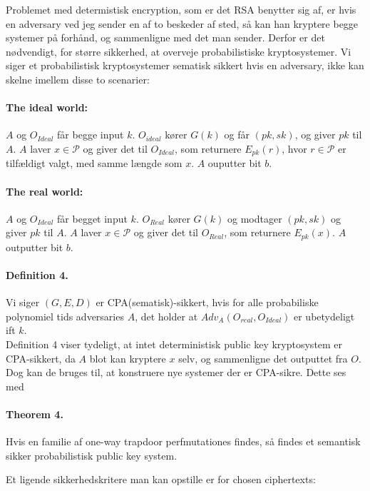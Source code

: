 \documentclass[paper=a4, fontsize=11pt]{scrartcl} %
\numberwithin{equation}{section} %
\numberwithin{figure}{section} %
\numberwithin{table}{section} %
\begin{document}
 	Problemet med determistisk encryption, som er det RSA benytter sig af, er hvis en adversary ved jeg sender en af to beskeder af sted, så kan han kryptere begge systemer på forhånd, og sammenligne med det man sender. Derfor er det nødvendigt, for større sikkerhed, at overveje probabilistiske kryptosystemer. Vi siger et probabilistisk kryptosystemer sematisk sikkert hvis en adversary, ikke kan skelne imellem disse to scenarier:
 	
 	\paragraph{\textbf{The ideal world:}} $A$ og $O_{Ideal}$ får begge input $k$. $O_{ideal}$ kører $G(k)$ og får $(pk,sk)$, og giver $pk$ til $A$. $A$ laver $x\in\mathcal{P}$ og giver det til $O_{Ideal}$, som returnere $E_{pk}(r)$, hvor $r\in\mathcal{P}$ er tilfældigt valgt, med samme længde som $x$. $A$ ouputter bit $b$.
 	\paragraph{\textbf{The real world:}} $A$ og $O_{Ideal}$ får begget input $k$. $O_{Real}$ kører $G(k)$ og modtager $(pk,sk)$ og giver $pk$ til $A$. $A$ laver $x\in\mathcal{P}$ og giver det til $O_{Real}$, som returnere $E_{pk}(x)$. $A$ outputter bit $b$.
 	
 	\paragraph{\textbf{Definition 4.}} Vi siger $(G,E,D)$ er CPA(sematisk)-sikkert, hvis for alle probabiliske polynomiel tids adversaries $A$, det holder at $Adv_A(O_{real},O_{Ideal})$ er ubetydeligt ift $k$. \\
 	
 	Definition 4 viser tydeligt, at intet deterministisk public key kryptosystem er CPA-sikkert, da $A$ blot kan kryptere $x$ selv, og sammenligne det outputtet fra $O$. Dog kan de bruges til, at konstruere nye systemer der er CPA-sikre. Dette ses med
 	
 	\paragraph{\textbf{Theorem 4.}} Hvis en familie af one-way trapdoor perfmutationes findes, så findes et semantisk sikker probabilistisk public key system.
 	
 	Et ligende sikkerhedskritere man kan opstille er for chosen ciphertexts:
 	
\end{document}
